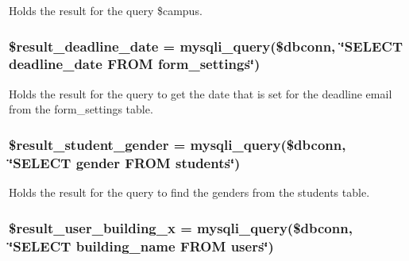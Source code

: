 \-Holds the result for the query \$campus. \hypertarget{admin__view_2index_8php_ad61a3f443fc1856c2ba99dfde9affc8c}{
\subsubsection[{\$result\-\_\-deadline\-\_\-date}]{\setlength{\rightskip}{0pt plus 5cm}\$result\-\_\-deadline\-\_\-date = mysqli\-\_\-query(\$dbconn, \char`\"{}\-S\-E\-L\-E\-C\-T deadline\-\_\-date \-F\-R\-O\-M form\-\_\-settings\char`\"{})}}\label{admin__view_2index_8php_ad61a3f443fc1856c2ba99dfde9affc8c}
\-Holds the result for the query to get the date that is set for the deadline email from the form\-\_\-settings table. \hypertarget{admin__view_2index_8php_adff53f8f2492a44a21e49f4a86980b2e}{
\subsubsection[{\$result\-\_\-student\-\_\-gender}]{\setlength{\rightskip}{0pt plus 5cm}\$result\-\_\-student\-\_\-gender = mysqli\-\_\-query(\$dbconn, \char`\"{}\-S\-E\-L\-E\-C\-T gender \-F\-R\-O\-M students\char`\"{})}}\label{admin__view_2index_8php_adff53f8f2492a44a21e49f4a86980b2e}
\-Holds the result for the query to find the genders from the students table. \hypertarget{admin__view_2index_8php_ac87f45c9f62c3f0628eef67281f382b3}{
\subsubsection[{\$result\-\_\-user\-\_\-building\-\_\-x}]{\setlength{\rightskip}{0pt plus 5cm}\$result\-\_\-user\-\_\-building\-\_\-x = mysqli\-\_\-query(\$dbconn, \char`\"{}\-S\-E\-L\-E\-C\-T building\-\_\-name \-F\-R\-O\-M users\char`\"{})}}\label{admin__view_2index_8php_ac87f45c9f62c3f0628eef67281f382b3}

